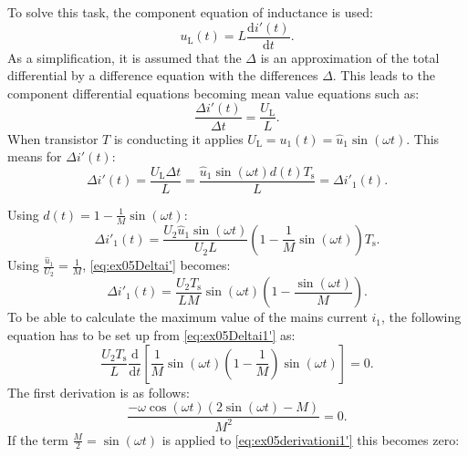 
\begin{solutionblock}
    To solve this task, the component equation of inductance is used:
    \begin{equation}
        u_{\mathrm{L}}(t) = L \frac{\mathrm{d}i'(t)}{\mathrm{d}t}.
    \end{equation}
    As a simplification, it is assumed that the $\Delta$ is an approximation of the total differential by a difference equation with the differences $\Delta$. This leads to the component differential equations becoming mean value equations such as:
    \begin{equation}
        \frac{\Delta i'(t)}{\Delta t} = \frac{U_{\mathrm{L}}}{L}.
    \end{equation}
    When transistor $T$ is conducting it applies $U_{\mathrm{L}} = u_{\mathrm{1}}(t) = \hat u_{\mathrm{1}} \sin(\omega t)$.
    This means for $\Delta i'(t)$:
\begin{equation}
    \Delta i'(t) = \frac{ U_{\mathrm{L}} \Delta t}{L} = \frac{\hat u_{\mathrm{1}} \sin(\omega t) d(t) T_{\mathrm{s}}}{L} = \Delta i'_{\mathrm{1}}(t).
\end{equation}

Using $d(t) = 1 -\frac{1}{M} \sin(\omega t)$:
 \begin{equation}
     \Delta i'_{\mathrm{1}}(t) = \frac{U_{\mathrm{2}}\hat u_{\mathrm{1}}\sin (\omega t)}{U_{\mathrm{2}}L}(1-\frac{1}{M}\sin(\omega t)) T_{\mathrm{s}}\label{eq:ex05Deltai'}.
 \end{equation}
 Using $\frac{\hat u_{\mathrm{1}}}{U_{\mathrm{2}}} = \frac{1}{M}$, \eqref{eq:ex05Deltai'} becomes:
 \begin{equation}
     \Delta i'_{\mathrm{1}}(t) = \frac{U_{\mathrm{2}}T_{\mathrm{s}}}{LM}\sin (\omega t)(1-\frac{\sin(\omega t)}{M}). \label{eq:ex05Deltai1'}
 \end{equation}
   To be able to calculate the maximum value of the mains current
    $i_\mathrm{1}$, the following equation has to be set up from \eqref{eq:ex05Deltai1'} as:
    \begin{equation}
        \frac{U_{\mathrm{2}}T_{\mathrm{s}}}{L} \frac{\mathrm{d}}{\mathrm{d}t}\left[\frac{1}{M}\sin(\omega t)\left(1-\frac{1}{M}\right)\sin(\omega t)\right] =0.
    \end{equation}
    The first derivation is as follows:
    \begin{equation}
        \frac{-\omega \cos(\omega t)(2\sin(\omega t)-M)}{M^2}=0.\label{eq:ex05derivationi1'}
    \end{equation}
    If the term $\frac{M}{2}=\sin(\omega t)$ is applied to \eqref{eq:ex05derivationi1'} this becomes zero:


\end{solutionblock}
